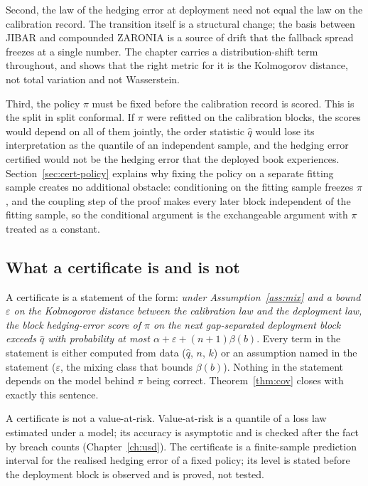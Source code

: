 \documentclass[../../../main.tex]{subfiles}
\begin{document}
Second, the law of the hedging error at deployment need not equal the law on the calibration record. The transition itself is a structural change; the basis between JIBAR and compounded ZARONIA is a source of drift that the fallback spread freezes at a single number. The chapter carries a distribution-shift term throughout, and shows that the right metric for it is the Kolmogorov distance, not total variation and not Wasserstein.

Third, the policy $\pi$ must be fixed before the calibration record is scored. This is the split in split conformal. If $\pi$ were refitted on the calibration blocks, the scores would depend on all of them jointly, the order statistic $\hat q$ would lose its interpretation as the quantile of an independent sample, and the hedging error certified would not be the hedging error that the deployed book experiences. Section~\ref{sec:cert-policy} explains why fixing the policy on a separate fitting sample creates no additional obstacle: conditioning on the fitting sample freezes $\pi$, and the coupling step of the proof makes every later block independent of the fitting sample, so the conditional argument is the exchangeable argument with $\pi$ treated as a constant.

\subsection{What a certificate is and is not}\label{sec:cert-isnot}

A certificate is a statement of the form: \emph{under Assumption~\ref{ass:mix} and a bound $\varepsilon$ on the Kolmogorov distance between the calibration law and the deployment law, the block hedging-error score of $\pi$ on the next gap-separated deployment block exceeds $\hat q$ with probability at most $\alpha+\varepsilon+(n+1)\beta(b)$}. Every term in the statement is either computed from data ($\hat q$, $n$, $k$) or an assumption named in the statement ($\varepsilon$, the mixing class that bounds $\beta(b)$). Nothing in the statement depends on the model behind $\pi$ being correct. Theorem~\ref{thm:cov} closes with exactly this sentence.

A certificate is not a value-at-risk. Value-at-risk is a quantile of a loss law estimated under a model; its accuracy is asymptotic and is checked after the fact by breach counts (Chapter~\ref{ch:usd}). The certificate is a finite-sample prediction interval for the realised hedging error of a fixed policy; its level is stated before the deployment block is observed and is proved, not tested.
\end{document}
